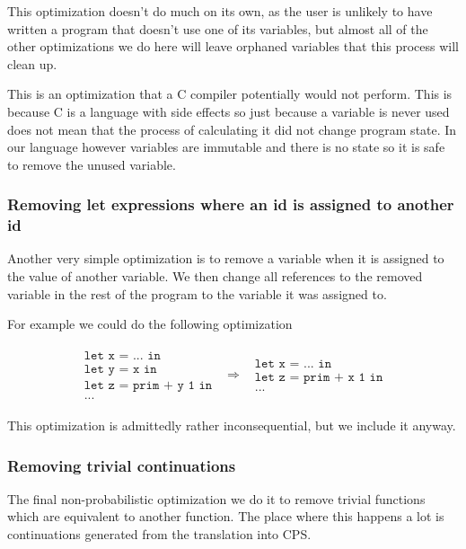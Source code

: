 \documentclass[a4paper]{article}
\newcommand{\optimization}[2]{
	\[
		\begin{array}{rcl}
			#1 & \Rightarrow & #2
		\end{array}
	\]
}
\begin{document}
This optimization doesn't do much on its own, as the user is unlikely to have written a program that doesn't use one of its variables, but almost all of the other optimizations we do here will leave orphaned variables that this process will clean up.

This is an optimization that a C compiler potentially would not perform. This is because C is a language with side effects so just because a variable is never used does not mean that the process of calculating it did not change program state. In our language however variables are immutable and there is no state so it is safe to remove the unused variable.



\subsubsection{Removing let expressions where an id is assigned to another id}

Another very simple optimization is to remove a variable when it is assigned to the value of another variable. We then change all references to the removed variable in the rest of the program to the variable it was assigned to.

For example we could do the following optimization

\optimization{
	\begin{array}{l}
		\texttt{let x = ... in} \\
		\texttt{let y = x in} \\
		\texttt{let z = prim + y 1 in}\\
		\texttt{...}
	\end{array}
}{
	\begin{array}{l}
		\texttt{let x = ... in} \\
		\texttt{let z = prim + x 1 in}\\
		\texttt{...}
	\end{array}
}

This optimization is admittedly rather inconsequential, but we include it anyway.



\subsubsection{Removing trivial continuations}

The final non-probabilistic optimization we do it to remove trivial functions which are equivalent to another function. The place where this happens a lot is continuations generated from the translation into CPS.
\end{document}
